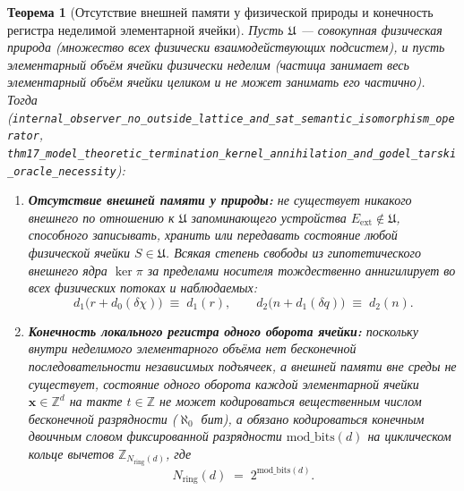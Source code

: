 \documentclass[11pt,a4paper]{article}
\theoremstyle{plain}
\newtheorem{theorem}{Теорема}[section]
\theoremstyle{definition}
\begin{document}
\begin{theorem}[Отсутствие внешней памяти у физической природы и конечность регистра неделимой элементарной ячейки]
\label{thm:no-external-memory}
Пусть $\mathfrak{U}$ --- совокупная физическая природа (множество всех физически взаимодействующих подсистем), и пусть элементарный объём ячейки физически неделим (частица занимает весь элементарный объём ячейки целиком и не может занимать его частично). Тогда (\texttt{internal\_\allowbreak observer\_\allowbreak no\_\allowbreak outside\_\allowbreak lattice\_\allowbreak and\_\allowbreak sat\_\allowbreak semantic\_\allowbreak isomorphism\_\allowbreak operator}, \texttt{thm17\_\allowbreak model\_\allowbreak theoretic\_\allowbreak termination\_\allowbreak kernel\_\allowbreak annihilation\_\allowbreak and\_\allowbreak godel\_\allowbreak tarski\_\allowbreak oracle\_\allowbreak necessity}):
\begin{enumerate}[label=\textbf{(\arabic*)},leftmargin=*]
\item \textbf{Отсутствие внешней памяти у природы:}
  не существует никакого внешнего по отношению к $\mathfrak{U}$ запоминающего устройства $E_{\mathrm{ext}} \notin \mathfrak{U}$, способного записывать, хранить или передавать состояние любой физической ячейки $S \in \mathfrak{U}$. Всякая степень свободы из гипотетического внешнего ядра $\ker\pi$ за пределами носителя тождественно аннигилирует во всех физических потоках и наблюдаемых:
  \begin{equation}
    \label{eq:no-ext-memory-kernel}
    d_1\bigl(r + d_0(\delta\chi)\bigr) \;\equiv\; d_1(r),
    \qquad
    d_2\bigl(n + d_1(\delta q)\bigr) \;\equiv\; d_2(n).
  \end{equation}
\item \textbf{Конечность локального регистра одного оборота ячейки:}
  поскольку внутри неделимого элементарного объёма нет бесконечной последовательности независимых подъячеек, а внешней памяти вне среды не существует, состояние одного оборота каждой элементарной ячейки $\mathbf{x} \in \mathbb{Z}^d$ на такте $t \in \mathbb{Z}$ не может кодироваться вещественным числом бесконечной разрядности ($\aleph_0$ бит), а обязано кодироваться конечным двоичным словом фиксированной разрядности $\mathrm{mod\_bits}(d)$ на циклическом кольце вычетов $\mathbb{Z}_{N_{\mathrm{ring}}(d)}$, где
  \begin{equation}
    \label{eq:nring-power-of-two}
    N_{\mathrm{ring}}(d) \;=\; 2^{\mathrm{mod\_bits}(d)}.
  \end{equation}
\end{enumerate}
\end{theorem}
\end{document}
